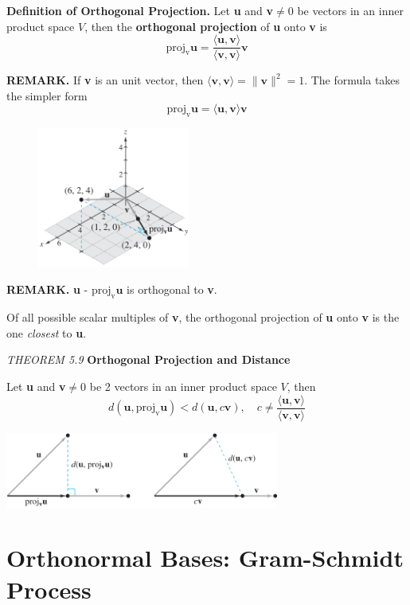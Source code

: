 \documentclass{article}
\newcommand\B{\textbf}
\newcommand\tcl{\begin{tcolorbox}[colback = {blue9}]}
\newcommand\etcl{\end{tcolorbox}}
\newcommand\T{\textit}
\newcommand\la{\langle}
\newcommand\ra{\rangle}
\begin{document}
    \tcl
    \B{Definition of Orthogonal Projection.} Let \B{u} and \B{v}$ \ne 0$ be vectors in an inner product space $V$,
    then the \B{orthogonal projection} of \B{u} onto \B{v} is
    \[ \text{proj}_{\text{v}}\B{u} = \frac{\la \B{u}, \B{v} \ra}{\la \B{v}, \B{v} \ra} \B{v}\]
    \etcl 
    \B{REMARK. } If \B{v} is an unit vector, then $\la \B{v}, \B{v} \ra = \| \B{v} \|^2 = 1$. The formula takes the
    simpler form \[ \text{proj}_{\text{v}}\B{u} = \la \B{u}, \B{v} \ra \B{v} \]
    
    \begin{minipage}{0.35\textwidth}
    \begin{figure}[H]
    \includegraphics[width = 5cm]{images/projr3.png}
    \end{figure}
    \end{minipage} 
    \begin{minipage}{0.5\textwidth}
        \B{REMARK. } \B{u} - $\text{proj}_\text{v}\B{u}$ is orthogonal to \B{v}. 

        Of all possible scalar multiples of \B{v}, the orthogonal projection of \B{u} onto \B{v} is the one
        \T{closest} to \B{u}.
    \end{minipage}
    \tcl
    \T{THEOREM 5.9} \B{Orthogonal Projection and Distance}

    Let \B{u} and \B{v}$ \ne 0$ be 2 vectors in an inner product space $V$, then
    \[ d(\B{u}, \text{proj}_\text{v}\B{u}) < d(\B{u}, c\B{v}), \quad c \ne \frac{\la \B{u}, \B{v} \ra}{\la \B{v}, \B{v} \ra}\]
    \etcl 
    \begin{center}
        \includegraphics[width = 9cm]{images/projclosest.png}
    \end{center}

    \section{Orthonormal Bases: Gram-Schmidt Process}
\end{document}
